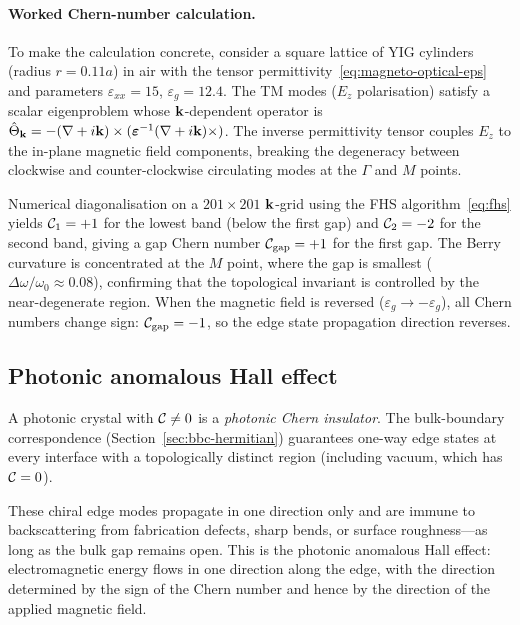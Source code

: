 \paragraph{Worked Chern-number calculation.}
To make the calculation concrete, consider a square lattice of YIG
cylinders (radius $r = 0.11a$) in air with the tensor
permittivity~\eqref{eq:magneto-optical-eps} and parameters
$\varepsilon_{xx} = 15$, $\varepsilon_g = 12.4$. The TM modes
($E_z$ polarisation) satisfy a scalar eigenproblem whose $\mathbf{k}$-dependent
operator is $\hat{\Theta}_{\mathbf{k}} = -(\nabla + i\mathbf{k})\times(\boldsymbol{\varepsilon}^{-1}(\nabla + i\mathbf{k})\times)$.
The inverse permittivity tensor couples $E_z$ to the in-plane magnetic
field components, breaking the degeneracy between clockwise and
counter-clockwise circulating modes at the $\Gamma$ and $M$ points.

Numerical diagonalisation on a $201\times201$ $\mathbf{k}$-grid using the FHS
algorithm~\eqref{eq:fhs} yields $\mathcal{C}_1 = +1$ for the lowest band
(below the first gap) and $\mathcal{C}_2 = -2$ for the second band, giving a
gap Chern number $\mathcal{C}_{\mathrm{gap}} = +1$ for the first gap. The
Berry curvature is concentrated at the $M$ point, where the gap is
smallest ($\Delta\omega/\omega_0 \approx 0.08$), confirming that the
topological invariant is controlled by the near-degenerate region. When
the magnetic field is reversed ($\varepsilon_g \to -\varepsilon_g$), all
Chern numbers change sign: $\mathcal{C}_{\mathrm{gap}} = -1$, so the edge
state propagation direction reverses.

\subsection{Photonic anomalous Hall effect}
\label{ssec:photonic-hall}

A photonic crystal with $\mathcal{C} \neq 0$ is a \emph{photonic Chern
insulator}. The bulk-boundary correspondence
(Section~\ref{sec:bbc-hermitian}) guarantees one-way edge states at
every interface with a topologically distinct region (including vacuum,
which has $\mathcal{C} = 0$).

These chiral edge modes propagate in one direction only and are immune
to backscattering from fabrication defects, sharp bends, or surface
roughness---as long as the bulk gap remains open. This is the photonic
anomalous Hall effect: electromagnetic energy flows in one direction
along the edge, with the direction determined by the sign of the Chern
number and hence by the direction of the applied magnetic field.

